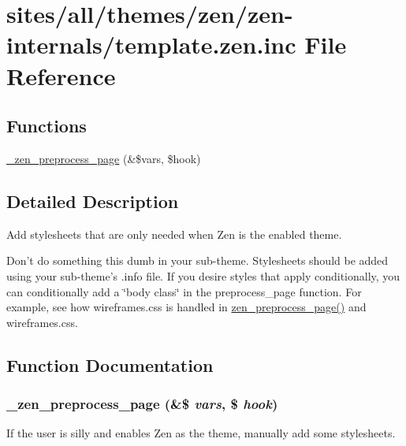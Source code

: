 \hypertarget{template_8zen_8inc}{
\section{sites/all/themes/zen/zen-internals/template.zen.inc File Reference}
\label{template_8zen_8inc}
}
\subsection*{Functions}
\begin{CompactItemize}
\item 
\hyperlink{template_8zen_8inc_225928a7bb03c49f9d9c279d2ae06034}{\_\-zen\_\-preprocess\_\-page} (\&\$vars, \$hook)
\end{CompactItemize}


\subsection{Detailed Description}
Add stylesheets that are only needed when Zen is the enabled theme.

Don't do something this dumb in your sub-theme. Stylesheets should be added using your sub-theme's .info file. If you desire styles that apply conditionally, you can conditionally add a \char`\"{}body class\char`\"{} in the preprocess\_\-page function. For example, see how wireframes.css is handled in \hyperlink{sites_2all_2themes_2zen_2template_8php_cf0810eb7d08edfccf3a1d5272348220}{zen\_\-preprocess\_\-page()} and wireframes.css. 

\subsection{Function Documentation}
\hypertarget{template_8zen_8inc_225928a7bb03c49f9d9c279d2ae06034}{
\subsubsection[{\_\-zen\_\-preprocess\_\-page}]{\setlength{\rightskip}{0pt plus 5cm}\_\-zen\_\-preprocess\_\-page (\&\$ {\em vars}, \/  \$ {\em hook})}}
\label{template_8zen_8inc_225928a7bb03c49f9d9c279d2ae06034}


If the user is silly and enables Zen as the theme, manually add some stylesheets. 